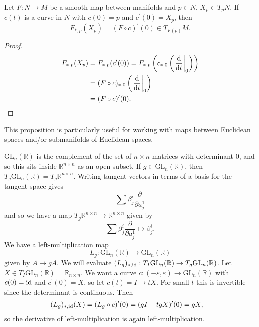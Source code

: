 \begin{prop}
Let $F: N \to M$ be a smooth map between manifolds and
$p \in N$, $X_p \in T_p N$. If $c(t)$ is a curve in $N$ with
$c(0) = p$ and $c^\prime(0) = X_p$, then
$$
  F_{\ast, p}(X_p)
= (F \circ c)^\prime(0) \in T_{F(p)} M.
$$
\end{prop}
\begin{proof}
\begin{align*}
   F_{\ast, p}(X_p)
&= F_{\ast, p}(c^\prime(0))
 = F_{\ast, p}
     \left(
       c_{\ast,0}
       \left(
         \left.\frac{\mathop{}\!\mathrm{d}}{\mathop{}\!\mathrm{d} t}\right|_0
       \right)
     \right) \\
&= (F \circ c)_{\ast, 0}
     \left(
       \left.\frac{\mathop{}\!\mathrm{d}}{\mathop{}\!\mathrm{d} t}\right|_0
     \right) \\
&= (F \circ c)^\prime(0).
\end{align*}
\end{proof}

\begin{remark}
This proposition is particularly useful for working with maps between
Euclidean spaces and/or submanifolds of Euclidean spaces.
\end{remark}

\begin{xmpl}
$\mathrm{GL}_n(\mathbb{R})$ is the complement of the set of $n \times
n$ matrices with determinant 0, and so this sits inside $\mathbb{R}^{n
  \times n}$ as an open subset. If $g \in \mathrm{GL}_n(\mathbb{R})$,
then $T_g \mathrm{GL}_n(\mathbb{R}) = T_g \mathbb{R}^{n \times n}$.
Writing tangent vectors in terms of a basis for the tangent space gives
$$
\sum
  \beta^i_j \frac{\partial}{\partial a^1_j}
$$
and so we have a map
$T_g \mathbb{R}^{n \times n} \to \mathbb{R}^{n \times n}$ given by
$$
\sum
  \beta^i_j \frac{\partial}{\partial a^1_j}
\mapsto
  \beta^i_j.
$$
We have a left-multiplication map
$$
L_g: \mathrm{GL}_n(\mathbb{R}) \to \mathrm{GL}_n(\mathbb{R})
$$
given by $A \mapsto gA$. We will evaluate
$(L_g)_{\ast, \mathrm{id}} : T_I \mathrm{GL}_n(\mathbb{R}) \to T_g \mathrm{GL}_n(\mathbb{R})$.
Let $X \in T_I \mathrm{GL}_n(\mathbb{R}) = \mathbb{R}_{n \times
  n}$. We want a curve
$c: (-\varepsilon, \varepsilon) \to \mathrm{GL}_n(\mathbb{R})$ with
$c(0) = \mathrm{id}$ and $c^\prime(0) = X$, so let $c(t) = I \to t X$. For
small $t$ this is invertible since the determinant is continuous. Then
\begin{align*}
   (L_g)_{\ast, \mathrm{id}}(X)
&= (L_g \circ c)^\prime(0)
 = (gI + tgX)^\prime(0)
 = gX,
\end{align*}
so the derivative of left-multiplication is again left-multiplication.
\end{xmpl}

